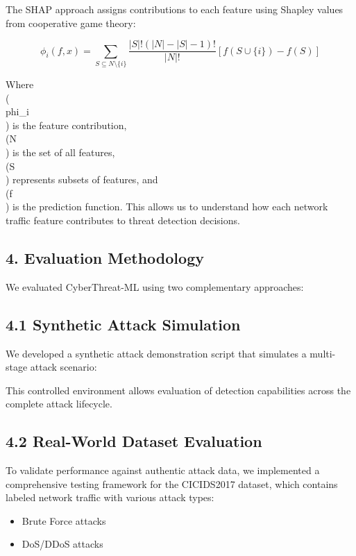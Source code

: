 \documentclass[12pt]{article}
\begin{document}
The SHAP approach assigns contributions to each feature using Shapley values from cooperative game theory:

\begin{equation}
\phi_i(f, x) = \sum_{S \subseteq N \setminus \{i\}} \frac{|S|!(|N|-|S|-1)!}{|N|!} [f(S \cup \{i\}) - f(S)]
\end{equation}

Where \\(\\phi\_i\\) is the feature contribution, \\(N\\) is the set of all features, \\(S\\) represents subsets of features, and \\(f\\) is the prediction function. This allows us to understand how each network traffic feature contributes to threat detection decisions.

\subsection{4. Evaluation Methodology}
We evaluated CyberThreat-ML using two complementary approaches:

\subsection{4.1 Synthetic Attack Simulation}
We developed a synthetic attack demonstration script that simulates a multi-stage attack scenario:

This controlled environment allows evaluation of detection capabilities across the complete attack lifecycle.

\subsection{4.2 Real-World Dataset Evaluation}
To validate performance against authentic attack data, we implemented a comprehensive testing framework for the CICIDS2017 dataset, which contains labeled network traffic with various attack types:

\begin{itemize}
\item Brute Force attacks
\end{itemize}

\begin{itemize}
\item DoS/DDoS attacks
\end{itemize}
\end{document}
